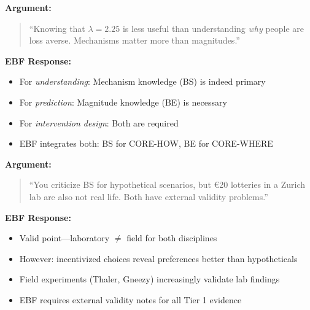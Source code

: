 \documentclass[11pt, a4paper]{article}
\begin{document}
\begin{tcolorbox}[colback=red!5!white, colframe=red!75!black,
    title=Critique 1: Parameter Fetishism]

\textbf{Argument:}
\begin{quote}
``Knowing that $\lambda = 2.25$ is less useful than understanding \textit{why} people are loss averse. Mechanisms matter more than magnitudes.''
\end{quote}

\textbf{EBF Response:}
\begin{itemize}[nosep]
    \item For \textit{understanding}: Mechanism knowledge (BS) is indeed primary
    \item For \textit{prediction}: Magnitude knowledge (BE) is necessary
    \item For \textit{intervention design}: Both are required
    \item EBF integrates both: BS for CORE-HOW, BE for CORE-WHERE
\end{itemize}

\end{tcolorbox}

\begin{tcolorbox}[colback=red!5!white, colframe=red!75!black,
    title=Critique 2: The Laboratory Paradox]

\textbf{Argument:}
\begin{quote}
``You criticize BS for hypothetical scenarios, but €20 lotteries in a Zurich lab are also not real life. Both have external validity problems.''
\end{quote}

\textbf{EBF Response:}
\begin{itemize}[nosep]
    \item Valid point---laboratory $\neq$ field for both disciplines
    \item However: incentivized choices reveal preferences better than hypotheticals
    \item Field experiments (Thaler, Gneezy) increasingly validate lab findings
    \item EBF requires external validity notes for all Tier 1 evidence
\end{itemize}

\end{tcolorbox}
\end{document}
